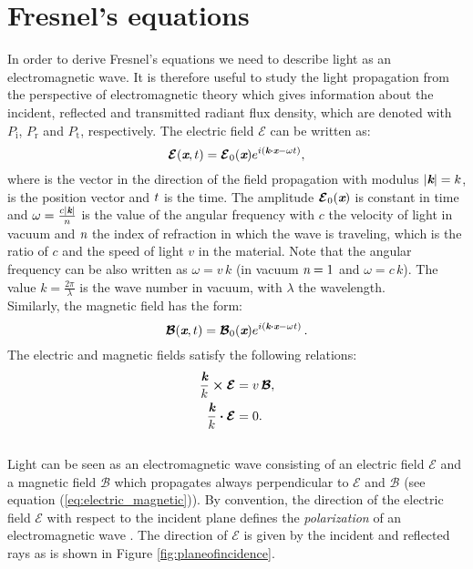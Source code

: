\section{Fresnel's equations}\label{sec:fresnel}
In order to derive Fresnel's equations we need to describe light as an electromagnetic wave. 
It is therefore useful to study the light propagation from the perspective of electromagnetic theory which gives information about the incident, reflected and transmitted radiant flux density, which are denoted with $P_\textrm{i}$, $P_\textrm{r}$ and $P_\textrm{t}$, respectively.  
The electric field $\boldsymbol{\mathcal{E}}$ can be written as: 
\begin{equation}
\boldsymbol{\mathcal{E}}(\textit{\textbf{x}}, t) = \boldsymbol{\mathcal{E}}_0(\textit{\textbf{x}} )e^{i( \textit{\textbf{k}}\boldsymbol{\cdot}\textit{\textbf{x}}-\omega t)},
\end{equation}
where  is the vector in the direction of the field propagation with modulus 
$|\textit{\textbf{k}}| = k$,  is the position vector and $t$ is the time. The amplitude $\boldsymbol{\mathcal{E}}_0(\textit{\textbf{x}})$ is constant in time and $\omega = \frac{c |\textit{\textbf{k}}|}{n}$ is the value of the angular frequency with $c$ the velocity of light in vacuum and $\textit{n}$ the index of refraction in which the wave is traveling, which is the ratio of $c$ and the speed of light $v$ in the material. Note that the angular frequency can be also written as $\omega = v\,k$ (in vacuum $\textit{n}=1$ and $\omega=c\,k$). The value
$k = \frac{2\pi}{\lambda}$ is the wave number in vacuum, with $\lambda$ the wavelength. \\ \indent Similarly, the magnetic field has the form:
\begin{equation}
\boldsymbol{\mathcal{B}}(\textit{\textbf{x}}, t) = \boldsymbol{\mathcal{B}}_0(\textit{\textbf{x}}) e^{i( \textit{\textbf{k}}\boldsymbol{\cdot} \textit{\textbf{x}}-\omega t )}\,.
\end{equation}
The electric and magnetic fields satisfy the following relations:
\begin{subequations}
\begin{align}
\frac{\textit{\textbf{k}}}{k} \boldsymbol{\times} \boldsymbol{\mathcal{E}} & = v \, \boldsymbol{\mathcal{B}}, \label{eq:electric_magnetic}\\
\frac{\textit{\textbf{k}}}{k} \boldsymbol{\cdot}\boldsymbol{\mathcal{E}} &=0.
\end{align}
\end{subequations}
\\ \indent Light can be seen as an electromagnetic wave consisting of an electric field $\boldsymbol{\mathcal{E}}$ and a magnetic field $\boldsymbol{\mathcal{B}}$ which propagates always perpendicular to $\boldsymbol{\mathcal{E}}$ and $\boldsymbol{\mathcal{B}}$ (see equation (\ref{eq:electric_magnetic})). By convention, the direction of the electric field $\boldsymbol{\mathcal{E}}$ with respect to the incident plane defines the \textit{polarization} of an electromagnetic wave \cite{feynman1964feynman}. The direction of $\boldsymbol{\mathcal{E}}$ is given by the incident and reflected rays as is shown in Figure \ref{fig:planeofincidence}. \\
